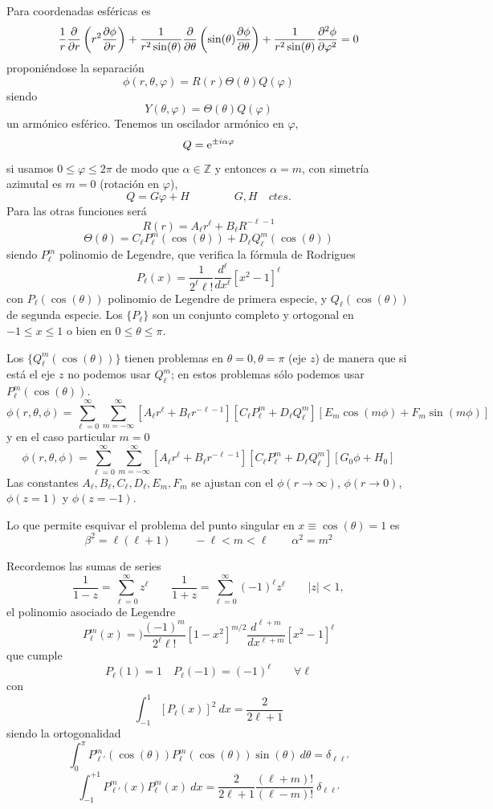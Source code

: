 \documentclass[10pt,oneside]{CBFT_book}
\begin{document}
Para coordenadas esféricas es
\[
	\frac{1}{r} \frac{\partial}{\partial r}\left( r^2 \dpar{\phi}{r} \right) + 
	\frac{1}{r^2 \sin(\theta)}\frac{\partial}{\partial\theta}\left(\sin(\theta)\dpar{\phi}{\theta}\right)+
	\frac{1}{r^2 \sin(\theta)} \dpar[2]{\phi}{\varphi} = 0
\]
proponiéndose la separación
\[
	\phi(r,\theta,\varphi) = R(r) \Theta(\theta) Q(\varphi)
\]
siendo
\[
	Y(\theta,\varphi) = \Theta(\theta) Q(\varphi)
\]
un armónico esférico.
Tenemos un oscilador armónico en $\varphi$,
\[
	Q = \euler^{\pm i\alpha \varphi}
\]
si usamos $0\leq \varphi \leq 2\pi$ de modo que $\alpha\in\mathbb{Z}$ y entonces $\alpha=m$, con simetría
azimutal es $m=0$ (rotación en $\varphi$), 
\[
	Q = G\varphi + H \qquad\qquad  G,H \quad ctes.
\]
Para las otras funciones será
\[
	R(r) = A_\ell r^\ell + B_\ell R^{-\ell-1}
\]
\[
	\Theta(\theta) = C_\ell P_\ell^m (\cos(\theta)) + D_\ell Q_\ell^m (\cos(\theta))
\]
siendo $P_\ell^m$ polinomio de Legendre, que verifica la fórmula de Rodrigues
\[
	P_\ell (x) = \frac{1}{2^\ell \ell!} \frac{d^\ell}{d x^\ell} [x^2 - 1]^\ell
\]
con $P_\ell(\cos(\theta))$ polinomio de Legendre de primera especie, y $Q_\ell(\cos(\theta))$ de segunda
especie.
Los $\{ P_\ell\}$ son un conjunto completo y ortogonal en $-1 \leq x \leq 1$ o bien en $0\leq \theta\leq \pi$.

Los $\{ Q_\ell^m(\cos(\theta))\}$ tienen problemas en $\theta=0,\theta=\pi$ (eje $z$) de manera que si está el
eje $z$ no podemos usar $Q_\ell^m$; en estos problemas sólo podemos usar $P_\ell^m(\cos(\theta))$.
\[
	\phi(r,\theta,\phi) = \sum_{\ell=0}^{\infty}\sum_{m=-\infty}^{\infty} \left[ A_\ell r^\ell + 
	B_\ell r^{-\ell-1} \right] \left[ C_\ell P_\ell^m + D_\ell Q_\ell^m \right] \left[ E_m \cos(m\phi) + 
	F_m \sin(m\phi) \right]
\]
y en el caso particular $m=0$
\[
	\phi(r,\theta,\phi) = \sum_{\ell=0}^{\infty}\sum_{m=-\infty}^{\infty} \left[ A_\ell r^\ell + 
	B_\ell r^{-\ell-1} \right] \left[ C_\ell P_\ell^m + D_\ell Q_\ell^m \right] \left[ G_0 \phi + 
	H_0 \right]	
\]
Las constantes $A_\ell, B_\ell, C_\ell, D_\ell, E_m, F_m$ se ajustan con el $\phi (r\to\infty)$, 
$\phi (r\to 0)$, $\phi (z = 1)$ y $\phi (z = -1)$.

Lo que permite esquivar el problema del punto singular en $x \equiv \cos(\theta)=1$ es
\[
	\beta^2 = \ell(\ell + 1) \qquad - \ell < m < \ell \qquad \alpha^2 = m^2
\]

Recordemos las sumas de series
\[
	\frac{1}{1-z} = \sum_{\ell=0}^{\infty} z^\ell \qquad \frac{1}{1+z} = \sum_{\ell=0}^{\infty} (-1)^\ell 
	z^\ell	\qquad |z|<1,
\]
el polinomio asociado de Legendre
\[
	P_\ell^m (x) =) \frac{(-1)^m}{2^\ell \ell!} [1-x^2]^{m/2} \frac{d^{\ell + m}}{dx^{\ell + m}} 
			[x^2 -1]^\ell
\]
que cumple
\[
	P_\ell (1) = 1 \quad P_\ell (-1) = (-1)^\ell \qquad  \forall \ell
\]
con 
\[
	\int_{-1}^1 [P_\ell (x)]^2 \: dx = \frac{2}{ 2\ell + 1 }
\]
siendo la ortogonalidad
\[
	\int_0^\pi P_{\ell'}^m (\cos(\theta)) P_\ell^m (\cos(\theta)) \sin(\theta) \: d\theta = 
	\delta_{\ell\ell'}
\]
\[
	\int_{-1}^{+1} P_{\ell'}^m (x) P_\ell^m (x) \: dx= \frac{2}{2\ell + 1}
	\frac{(\ell + m)!}{(\ell - m)!} \: \delta_{\ell\ell'}
\]
\end{document}

